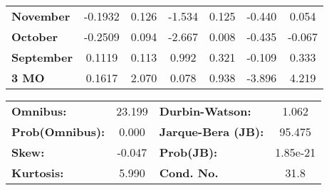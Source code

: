 \begin{center}
\begin{tabular}{lcccccc}
\textbf{November}  &      -0.1932  &        0.126     &    -1.534  &         0.125        &       -0.440    &        0.054     \\
\textbf{October}   &      -0.2509  &        0.094     &    -2.667  &         0.008        &       -0.435    &       -0.067     \\
\textbf{September} &       0.1119  &        0.113     &     0.992  &         0.321        &       -0.109    &        0.333     \\
\textbf{3 MO}      &       0.1617  &        2.070     &     0.078  &         0.938        &       -3.896    &        4.219     \\
\bottomrule
\end{tabular}
\begin{tabular}{lclc}
\textbf{Omnibus:}       & 23.199 & \textbf{  Durbin-Watson:     } &    1.062  \\
\textbf{Prob(Omnibus):} &  0.000 & \textbf{  Jarque-Bera (JB):  } &   95.475  \\
\textbf{Skew:}          & -0.047 & \textbf{  Prob(JB):          } & 1.85e-21  \\
\textbf{Kurtosis:}      &  5.990 & \textbf{  Cond. No.          } &     31.8  \\
\bottomrule
\end{tabular}
\end{center}

